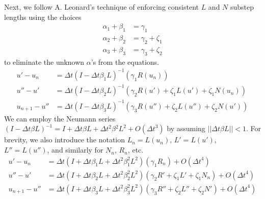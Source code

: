\documentclass[letterpaper,11pt]{amsart}
\newcommand{\order}[2]{\ensuremath{O\!\left( {#1}^{#2} \right)}}
\begin{document}
Next, we follow A. Leonard's technique of enforcing consistent $L$ and $N$
substep lengths using the choices
\begin{subequations}
\begin{align}
  \alpha_{1} + \beta_{1} &= \gamma_{1}
  \\
  \alpha_{2} + \beta_{2} &= \gamma_{2}+\zeta_{1}
  \\
  \alpha_{3} + \beta_{3} &= \gamma_{3}+\zeta_{2}
\end{align}
\end{subequations}
to eliminate the unknown $\alpha$'s from the equations.
\begin{subequations}
\begin{align}
  u' - u_{n}
  &=
  \Delta{}t \left( I - \Delta{}t \beta_{1} L \right)^{-1} \left(
    \gamma_{1} R(u_{n})
  \right)
\\
  u'' - u'
  &=
  \Delta{}t \left( I - \Delta{}t \beta_{2} L \right)^{-1} \left(
      \gamma_{2} R(u')
    + \zeta_{1} L(u')
    + \zeta_{1} N(u_{n})
  \right)
\\
  u_{n+1} - u''
  &=
  \Delta{}t \left( I - \Delta{}t \beta_{3} L \right)^{-1} \left(
      \gamma_{3} R(u'')
    + \zeta_{2}  L(u'')
    + \zeta_{2}  N(u')
  \right)
\end{align}
\end{subequations}
We can employ the Neumann series $\left( I - \Delta{}t  \beta{}
L \right)^{-1} = I + \Delta{}t \beta{} L + \Delta{}t^{2} \beta{}^{2}
L^{2} + \order{\Delta{}t}{3}$ by assuming $||\Delta{}t\beta{}L||<1$.
For brevity, we also introduce the notation
$L_{n}=L(u_{n})$,
$L'=L(u')$,
$L''=L(u'')$,
and similarly for $N_{n}$, $R_{n}$, etc.
\begin{subequations}
\begin{align}
  u' - u_{n}
  &=
  \Delta{}t
  \left(
      I
    + \Delta{}t \beta_{1} L
    + \Delta{}t^{2} \beta_{1}^{2} L^{2}
  \right)
  \left(
    \gamma_{1} R_{n}
  \right)
  + \order{\Delta{}t}{4}
\\
  u'' - u'
  &=
  \Delta{}t
  \left(
      I
    + \Delta{}t \beta_{2} L
    + \Delta{}t^{2} \beta_{2}^{2} L^{2}
  \right)
  \left(
      \gamma_{2} R'
    + \zeta_{1}  L'
    + \zeta_{1}  N_{n}
  \right)
  + \order{\Delta{}t}{4}
\\
  u_{n+1} - u''
  &=
  \Delta{}t
  \left(
      I
    + \Delta{}t \beta_{3} L
    + \Delta{}t^{2} \beta_{3}^{2} L^{2}
  \right)
  \left(
      \gamma_{3} R''
    + \zeta_{2}  L''
    + \zeta_{2}  N'
  \right)
  + \order{\Delta{}t}{4}
\end{align}
\end{subequations}
\end{document}
